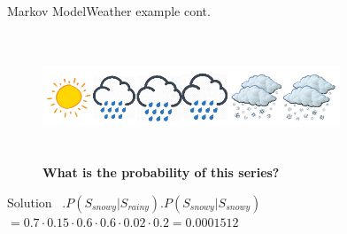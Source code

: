 \documentclass[10pt]{beamer}
\begin{document}
\begin{frame}[allowframebreaks]{Markov Model}{Weather example cont.}
\begin{figure}[h]
    \centering
    \includegraphics[width=3.5in,height=1.5in]{figures/weather_example_2.png}
    \caption {\textbf{What is the probability of this series?}}
  \end{figure}
   \begin{block}{Solution}
       \
       $.P(S_{snowy}|S_{rainy}).P(S_{snowy}|S_{snowy})$\\
       $=0.7\cdot0.15\cdot0.6\cdot0.6\cdot0.02\cdot0.2=0.0001512$
   \end{block}
\end{frame}

{\1
\begin{frame}
\end{frame}}
\end{document}
